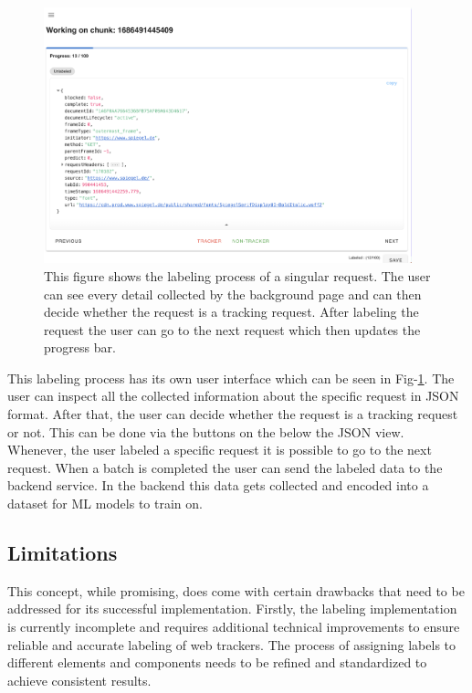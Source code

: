\begin{figure}
  \begin{center}
    \includegraphics[width=0.95\textwidth]{images/Labeling.png}
  \end{center}
  \caption{This figure shows the labeling process of a singular request. The user can see every detail collected by the 
  background page and can then decide whether the request is a tracking request. After labeling the request the user can 
  go to the next request which then updates the progress bar.
}
  \label{fig:Labeling}
\end{figure}


This labeling process has its own user interface which can be seen in Fig-\ref{fig:Labeling}. The user can inspect all the collected information
about the specific request in JSON format. After that, the user can decide whether the request is a tracking request or not. This can be done via 
the buttons on the below the JSON view. Whenever, the user labeled a specific request it is possible to go to the next request. When a batch is
completed the user can send the labeled data to the backend service. In the backend this data gets collected and encoded into a dataset for ML
models to train on. 

\subsection{Limitations}

This concept, while promising, does come with certain drawbacks that need to be addressed for its successful implementation.
Firstly, the labeling implementation is currently incomplete and requires additional technical improvements to ensure reliable
and accurate labeling of web trackers. The process of assigning labels to different elements and components needs to be refined
and standardized to achieve consistent results.

